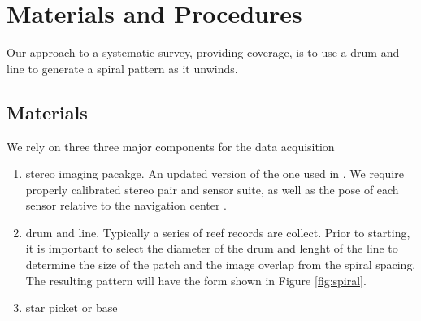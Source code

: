 \section{Materials and Procedures}

Our approach to a systematic survey, providing  coverage, is to use a drum and line to generate a spiral pattern as it unwinds.


\subsection{Materials}
We rely on three three major components for the data acquisition
\begin{enumerate}
\item stereo imaging pacakge. An updated version of the one used in \cite{Henderson_2013}. We require properly calibrated stereo pair and sensor suite, as well as the pose of each sensor relative to the navigation center \cite{Johnson_Roberson_2013} \cite{}.
\item drum and line. Typically a series of reef records are collect. Prior to starting, it is important to select the diameter of the drum and lenght of the line to determine the size of the patch and the image overlap from the spiral spacing. The resulting pattern will have the form shown in Figure \ref{fig:spiral}.

\item star picket or base
\end{enumerate}

